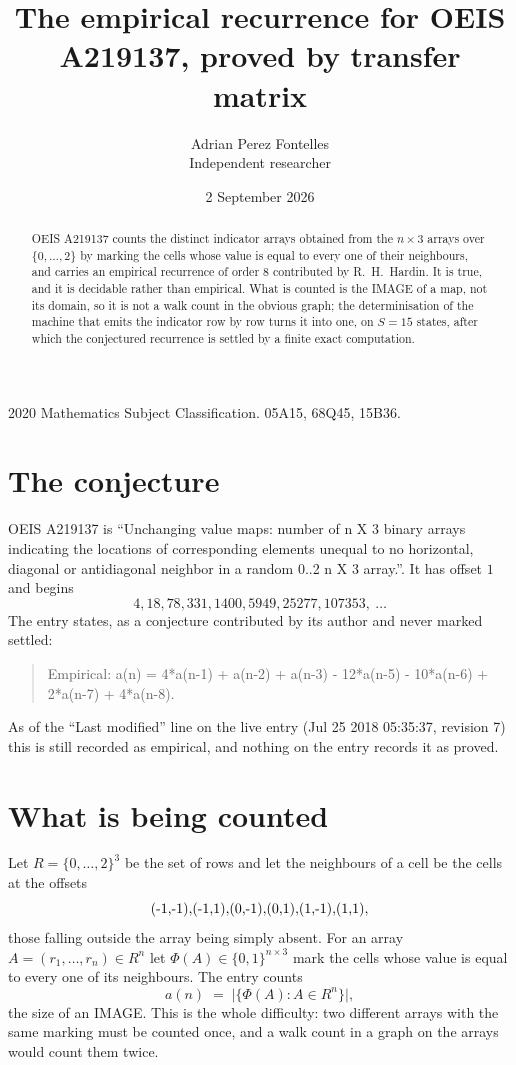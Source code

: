 \documentclass[11pt,a4paper]{article}
\title{The empirical recurrence for OEIS A219137, proved by transfer matrix}
\author{Adrian Perez Fontelles\\ \small Independent researcher}
\date{2 September 2026}
\theoremstyle{plain}
\theoremstyle{definition}
\begin{document}
\maketitle

\begin{abstract}
OEIS A219137 counts the distinct indicator arrays obtained from the $n\times3$ arrays over
$\{0,\dots,2\}$ by marking the cells whose value is equal to every one of their neighbours, and carries an
empirical recurrence of order $8$ contributed by R.~H.~Hardin. It is true, and it is
decidable rather than empirical. What is counted is the IMAGE of a map, not its domain, so it
is not a walk count in the obvious graph; the determinisation of the machine that emits the
indicator row by row turns it into one, on $S=15$ states, after which the conjectured
recurrence is settled by a finite exact computation.
\end{abstract}

\noindent\small 2020 Mathematics Subject Classification. 05A15, 68Q45, 15B36.\normalsize

\section{The conjecture}

OEIS A219137 is ``Unchanging value maps: number of n X 3 binary arrays indicating the locations of corresponding elements unequal to no horizontal, diagonal or antidiagonal neighbor in a random 0..2 n X 3 array.''. It has offset $1$ and begins
\[
4, 18, 78, 331, 1400, 5949, 25277, 107353,\ \dots
\]
The entry states, as a conjecture contributed by its author and never marked settled:
\begin{quote}
Empirical: a(n) = 4*a(n-1) + a(n-2) + a(n-3) - 12*a(n-5) - 10*a(n-6) + 2*a(n-7) + 4*a(n-8).
\end{quote}
As of the ``Last modified'' line on the live entry (Jul 25 2018 05:35:37, revision 7) this is still
recorded as empirical, and nothing on the entry records it as proved.

\section{What is being counted}

Let $R=\{0,\dots,2\}^{3}$ be the set of rows and let the neighbours of a cell be the
cells at the offsets
\[
$(-1,-1)$, $(-1,1)$, $(0,-1)$, $(0,1)$, $(1,-1)$, $(1,1)$,
\]
those falling outside the array being simply absent. For an array
$A=(r_1,\dots,r_n)\in R^n$ let $\Phi(A)\in\{0,1\}^{n\times3}$ mark the cells whose value
is equal to every one of its neighbours. The entry counts
\[
a(n)\;=\;\bigl|\{\Phi(A):A\in R^n\}\bigr| ,
\]
the size of an IMAGE. This is the whole difficulty: two different arrays with the same marking
must be counted once, and a walk count in a graph on the arrays would count them twice.
\end{document}
